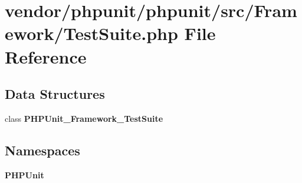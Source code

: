 \section{vendor/phpunit/phpunit/src/\+Framework/\+Test\+Suite.php File Reference}
\label{_test_suite_8php}
\subsection*{Data Structures}
\begin{DoxyCompactItemize}
\item 
class {\bf P\+H\+P\+Unit\+\_\+\+Framework\+\_\+\+Test\+Suite}
\end{DoxyCompactItemize}
\subsection*{Namespaces}
\begin{DoxyCompactItemize}
\item 
 {\bf P\+H\+P\+Unit}
\end{DoxyCompactItemize}
